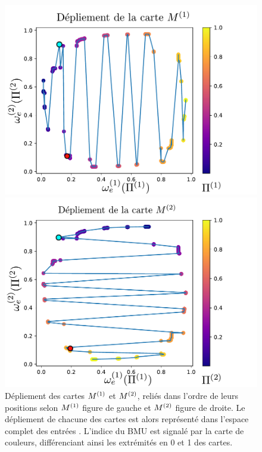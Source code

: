 \documentclass[../main]{subfiles}
\begin{document}
\begin{figure}
    \begin{minipage}{0.49\textwidth}
    \includegraphics[width=\textwidth]{disto_cercle_M1.pdf}
    \end{minipage}
    \begin{minipage}{0.49\textwidth}
    \includegraphics[width=\textwidth]{disto_cercle_M2.pdf}
    \end{minipage}
    \caption{Dépliement des cartes $M^{({1})}$ et $M^{({2})}$, reliés dans l'ordre de leurs positions selon $M^{({1})}$ figure de gauche et $M^{({2})}$ figure de droite. Le dépliement de chacune des cartes est alors représenté dans l'espace complet des entrées \label{fig:distortion}. L'indice du BMU est signalé par la carte de couleurs, différenciant ainsi les extrémités en 0 et 1 des cartes.}
    \end{figure}
\end{document}
